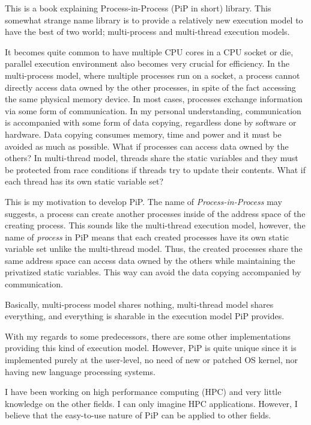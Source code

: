 
This is a book explaining Process-in-Process (PiP in short)
library. This somewhat strange name library is to provide a relatively
new execution model to have the best of two world; multi-process and
multi-thread execution models. 

It becomes quite common to have multiple CPU cores in a CPU
socket or die, parallel execution environment also becomes very
crucial for efficiency. In the multi-process model, where multiple
processes run on a socket, a process cannot directly access data owned
by the other processes, in spite of the fact accessing the same physical
memory device. In most cases, processes exchange information via some
form of communication. In my personal understanding, communication is
accompanied with some form of data copying, regardless done by software or
hardware. Data copying consumes memory, time and power and it must be
avoided as much as possible. What if processes can access data owned
by the others? In multi-thread model, threads share the static
variables and they must be protected from race conditions if threads
try to update their contents. What if each thread has its own static
variable set? 

This is my motivation to develop PiP. The name of {\it
  Process-in-Process} may suggests, a process can create another
processes inside of the address space of the creating process. This
sounds like the multi-thread execution model, however, the name of
{\it process} in PiP means that each created processes have its own
static variable set unlike the multi-thread model. Thus, the created
processes share the same address space can access data owned by the
others while maintaining the privatized static variables. This way can
avoid the data copying accompanied by communication.

Basically, multi-process model shares nothing, multi-thread model
shares everything, and everything is sharable in the execution model
PiP provides. 

With my regards to some predecessors, there are some other
implementations providing this kind of execution model. However, PiP
is quite unique since it is implemented purely at the user-level, no
need of new or patched OS kernel, nor having new language processing
systems.  

I have been working on high performance computing (HPC) and very little
knowledge on the other fields. I can only imagine HPC
applications. However, I believe that the easy-to-use nature of PiP
can be applied to other fields. 
